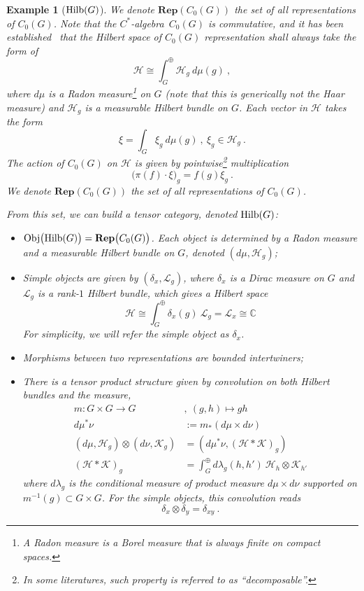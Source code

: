 \documentclass[a4paper,11pt]{article}
\newtheorem{exm}[lemma]{Example}
\newcommand{\Ch}{\mathrm{Ch}}
\newcommand{\CH}{\Ch_{\mu_1\mu_2}(Q_F,{t},{q})}
\newcommand{\Rep}{\textbf{Rep}}
\newcommand{\be}{\begin{equation}}
\newcommand{\ee}{\end{equation}}
\newcommand{\ba}{\begin{aligned}}
\newcommand{\ea}{\end{aligned}}
\def\bbC{\mathbb{C}}
\def\CH{\mathcal{H}}
\def\CK{\mathcal{K}}
\def\CL{\mathcal{L}}
\def\calg{$C^*$-algebra\ }
\begin{document}
\begin{exm}[${\rm Hilb}(G)$]\label{eg:HilbG}
    We denote $\Rep(C_0(G))$ the set of all representations of $C_0(G)$. Note that the \calg $C_0(G)$ is commutative, and it has been established~\cite{Takesaki:1979,Farah:2019} that the Hilbert space of $C_0(G)$ representation shall always take the form of
    \be
    \CH \cong \int_G^\oplus  \CH_g \  d\mu(g) \ ,
    \ee
    where $d\mu$ is a Radon measure\footnote{A Radon measure is a Borel measure that is always finite on compact spaces.} on $G$ (note that this is generically not the Haar measure) and $\CH_g$ is a measurable Hilbert bundle on $G$. Each vector in $\CH$ takes the form
    \be \xi = \int_G  \xi_g \ d\mu(g) \  , \ \xi_g \in \CH_g \ .\ee
    The action of $C_0(G)$ on $\CH$ is given by pointwise\footnote{In some literatures, such property is referred to as ``decomposable''.} multiplication
    \be \big(\pi(f)\cdot \xi\big)_g = f(g)\xi_g \ .  \ee
    We denote $\Rep(C_0(G))$ the set of all representations of $C_0(G)$.

    From this set, we can build a tensor category, denoted ${\rm Hilb}(G)$:
    \begin{itemize}
        \item ${\rm Obj}\big({\rm Hilb}(G)\big) = \Rep\big( C_0( G) \big)$. Each object is determined by a Radon measure and a measurable Hilbert bundle on $G$, denoted $(d\mu,\CH_g)$;
        \item Simple objects are given by $(\delta_x, \CL_g)$, where $\delta_x$ is a Dirac measure on $G$ and $\CL_g$ is a rank-$1$ Hilbert bundle, which gives a Hilbert space
        \be  \CH \cong \int_G^\oplus  \delta_x(g) \  \CL_g  = \CL_x \cong \bbC\ee
        For simplicity, we will refer the simple object as $\delta_x$.
        \item Morphisms between two representations are bounded intertwiners;
        \item There is a tensor product structure given by convolution on both Hilbert bundles and the measure,
        \be \ba
        m: G\times G\to G \ &, \ (g,h)\mapsto gh \\
        d\mu^*\nu &:= m_*(d\mu\times d\nu)\\
        (d\mu, \CH_g) \otimes (d\nu,\CK_g) &= (d\mu^*\nu, (\CH*\CK)_g ) \\
        (\CH*\CK)_g &= \int_G^{\oplus} d\lambda_g(h,h')\ \CH_{h}\otimes \CK_{h'}
        \ea \ee
        where $d\lambda_g$ is the conditional measure of product measure $d\mu\times d\nu$ supported on $m^{-1}(g)\subset G\times G$. For the simple objects, this convolution reads
        \be  \delta_x \otimes \delta_y = \delta_{xy} \ .  \ee
    \end{itemize}
\end{exm}
\end{document}
